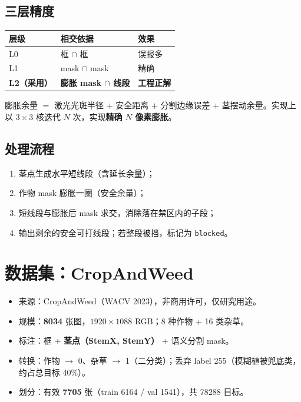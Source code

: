\documentclass[11pt,a4paper]{article}
\begin{document}
\subsection{三层精度}

\begin{table}[h]
\centering
\begin{tabular}{lll}
\toprule
\textbf{层级} & \textbf{相交依据} & \textbf{效果} \\
\midrule
L0 & 框 $\cap$ 框 & 误报多 \\
L1 & mask $\cap$ mask & 精确 \\
\textbf{L2（采用）} & \textbf{膨胀 mask $\cap$ 线段} & \textbf{工程正解} \\
\bottomrule
\end{tabular}
\end{table}

膨胀余量 $= $ 激光光斑半径 $+$ 安全距离 $+$ 分割边缘误差 $+$ 茎摆动余量。实现上以 $3\times3$ 核迭代 $N$ 次，实现\textbf{精确 $N$ 像素膨胀}。

\subsection{处理流程}

\begin{enumerate}[label=\textbf{(\arabic*)}]
  \item 茎点生成水平短线段（含延长余量）；
  \item 作物 mask 膨胀一圈（安全余量）；
  \item 短线段与膨胀后 mask 求交，消除落在禁区内的子段；
  \item 输出剩余的安全可打线段；若整段被挡，标记为 \texttt{blocked}。
\end{enumerate}

\section{数据集：CropAndWeed}\label{sec:dataset}

\begin{itemize}[leftmargin=1.5em]
  \item 来源：CropAndWeed（WACV 2023），非商用许可，仅研究用途。
  \item 规模：\textbf{8034} 张图，$1920\times1088$ RGB；8 种作物 + 16 类杂草。
  \item 标注：框 + \textbf{茎点（StemX, StemY）} + 语义分割 mask。
  \item 转换：作物 $\to$ 0、杂草 $\to$ 1（二分类）；丢弃 label 255（模糊植被兜底类，约占总目标 40\%）。
  \item 划分：有效 \textbf{7705} 张（train 6164 / val 1541），共 78288 目标。
\end{itemize}
\end{document}
